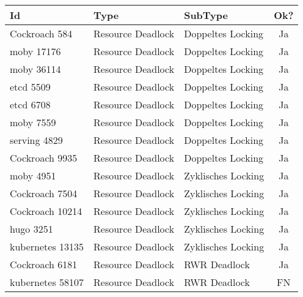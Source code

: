 \newpage

\begin{longtable}[c]{|l|l|l|c|}
  \hline
  \textbf{Id} & \textbf{Type}  & \textbf{SubType}    & \multicolumn{1}{l|}{\textbf{Ok?}} \\ \hline
  \endfirsthead
  \endhead
  Cockroach 584      & Resource Deadlock      & Doppeltes Locking      & Ja                                   \\ \hline
  moby 17176      & Resource Deadlock      & Doppeltes Locking      & Ja                                   \\ \hline
  moby 36114      & Resource Deadlock      & Doppeltes Locking      & Ja                                   \\ \hline
  etcd 5509      & Resource Deadlock      & Doppeltes Locking      & Ja                                   \\ \hline
  etcd 6708      & Resource Deadlock      & Doppeltes Locking      & Ja                                   \\ \hline
  moby 7559      & Resource Deadlock      & Doppeltes Locking      & Ja                                   \\ \hline
  serving 4829      & Resource Deadlock      & Doppeltes Locking      & Ja                                   \\ \hline
  Cockroach 9935      & Resource Deadlock      & Doppeltes Locking      & Ja                                   \\ \hline
  moby 4951      & Resource Deadlock      & Zyklisches Locking     & Ja                                   \\ \hline
  Cockroach 7504      & Resource Deadlock      & Zyklisches Locking     & Ja                                   \\ \hline
  Cockroach 10214      & Resource Deadlock      & Zyklisches Locking     & Ja                                   \\ \hline
  hugo 3251      & Resource Deadlock      & Zyklisches Locking     & Ja                                   \\ \hline
  kubernetes 13135      & Resource Deadlock      & Zyklisches Locking     & Ja                                   \\ \hline
  Cockroach 6181      & Resource Deadlock      & RWR Deadlock           & Ja                                   \\ \hline
  kubernetes 58107      & Resource Deadlock      & RWR Deadlock           & FN                                 \\ \hline

\end{longtable}
